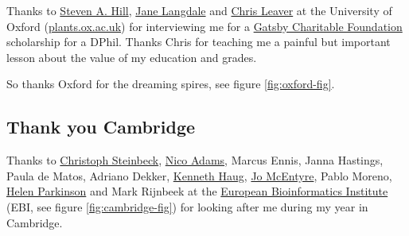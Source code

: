 \documentclass[
]{book}
\begin{document}
Thanks to \href{https://en.wikipedia.org/wiki/Steven_A._Hill}{Steven A. Hill}, \href{https://en.wikipedia.org/wiki/Jane_A._Langdale}{Jane Langdale} and \href{https://en.wikipedia.org/wiki/Chris_J._Leaver}{Chris Leaver} at the University of Oxford (\href{https://www.plants.ox.ac.uk/}{plants.ox.ac.uk}) for interviewing me for a \href{https://www.gatsby.org.uk/about-gatsby}{Gatsby Charitable Foundation} scholarship for a DPhil. Thanks Chris for teaching me a painful but important lesson about the value of my education and grades.

So thanks Oxford for the dreaming spires, see figure \ref{fig:oxford-fig}. 🙏

\hypertarget{cambridge}{%
\subsection{Thank you Cambridge}\label{cambridge}}

Thanks to \href{https://en.wikipedia.org/wiki/Christoph_Steinbeck}{Christoph Steinbeck}, \href{https://scholar.google.com/citations?user=3-PcEsEAAAAJ}{Nico Adams}, Marcus Ennis, Janna Hastings, Paula de Matos, Adriano Dekker, \href{https://twitter.com/kennethhaug}{Kenneth Haug}, \href{https://twitter.com/jomcentyre}{Jo McEntyre}, Pablo Moreno, \href{https://twitter.com/drp_stuff}{Helen Parkinson} and Mark Rijnbeek at the \href{https://en.wikipedia.org/wiki/European_Bioinformatics_Institute}{European Bioinformatics Institute} (EBI, see figure \ref{fig:cambridge-fig}) for looking after me during my year in Cambridge.
\end{document}
